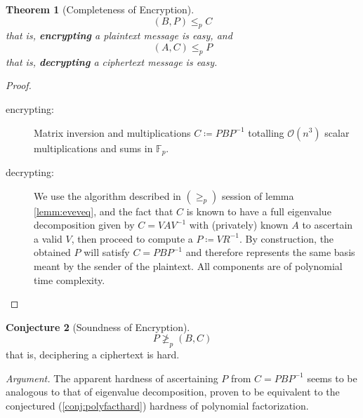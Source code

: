 \documentclass[a4paper,10pt]{article}
\theoremstyle{plain}
\newtheorem{thm}{Theorem}[section] %
\theoremstyle{definition}
\newtheorem{conj}[thm]{Conjecture} %
\theoremstyle{named}
\begin{document}
\begin{thm}[Completeness of Encryption]
  \[(B,P) \leq_p C\]
  that is, \textbf{encrypting} a plaintext message is easy, and
  \[(A,C) \leq_p P\]
  that is, \textbf{decrypting} a ciphertext message is easy.
\end{thm}
\begin{proof}
$\,$
\begin{description}
\item [encrypting:] Matrix inversion and multiplications $C \coloneqq PBP^{-1}$ totalling $\mathcal{O}(n^3)$ scalar multiplications and sums in $\mathbb{F}_p$.
\item [decrypting:] We use the algorithm described in $(\geq_p)$ session of lemma \ref{lemm:eveveq}, and the fact that $C$ is known to have a full eigenvalue decomposition given by $C = VAV^{-1}$ with (privately) known $A$ to ascertain a valid $V$, then proceed to compute a $P \coloneqq VR^{-1}$. By construction, the obtained $P$ will satisfy $C = PBP^{-1}$ and therefore represents the same basis meant by the sender of the plaintext. All components are of polynomial time complexity.
\end{description}
\end{proof}

\begin{conj}[Soundness of Encryption]
  \[P \ngeq_p (B,C)\]
  that is, deciphering a ciphertext is hard.
\end{conj}
\textit{Argument.} The apparent hardness of ascertaining $P$ from $C = PBP^{-1}$ seems to be analogous to that of eigenvalue decomposition, proven to be equivalent to the conjectured (\ref{conj:polyfacthard}) hardness of polynomial factorization.%
\end{document}
